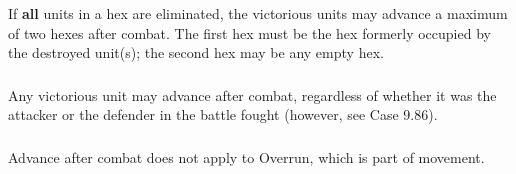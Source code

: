 \subsubsection{} If \textbf{all} units in a hex are eliminated, the victorious units may advance a maximum of two hexes after combat. The first hex must be the hex formerly occupied by the destroyed unit(s); the second hex may be any empty hex.

\subsubsection{} Any victorious unit may advance after combat, regardless of whether it was the attacker or the defender in the battle fought (however, see Case 9.86).

\subsubsection{} Advance after combat does not apply to Overrun, which is part of movement.